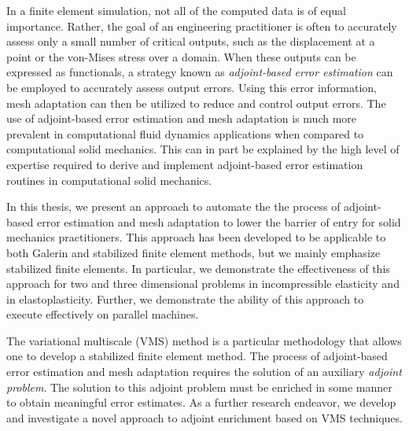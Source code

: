 
In a finite element simulation, not all of the computed
data is of equal importance. Rather, the goal of an engineering
practitioner is often to accurately assess only a small
number of critical outputs, such as the displacement
at a point or the von-Mises stress over a domain. When
these outputs can be expressed as functionals,
a strategy known as \emph{adjoint-based error estimation}
can be employed to accurately assess output errors.
Using this error information, mesh adaptation can then
be utilized to reduce and control output errors.
The use of adjoint-based error estimation and mesh adaptation
is much more prevalent in computational fluid dynamics
applications when compared to computational solid mechanics.
This can in part be explained by the high level of expertise
required to derive and implement adjoint-based error estimation
routines in computational solid mechanics.

In this thesis, we present an approach to automate the
the process of adjoint-based error estimation and mesh
adaptation to lower the barrier of entry for solid
mechanics practitioners. This approach has been developed
to be applicable to both Galerin and stabilized finite
element methods, but we mainly emphasize stabilized finite
elements. In particular, we demonstrate the
effectiveness of this approach for two and three
dimensional problems in incompressible elasticity and
in elastoplasticity. Further, we demonstrate the ability
of this approach to execute effectively on parallel
machines.

The variational multiscale (VMS) method is a particular
methodology that allows one to develop a stabilized
finite element method.
The process of adjoint-based error estimation and mesh
adaptation requires the solution of an auxiliary
\emph{adjoint problem}. The solution to this adjoint problem
must be enriched in some manner to obtain meaningful error
estimates. As a further research endeavor, we develop and
investigate a novel approach to adjoint enrichment based on
VMS techniques.
